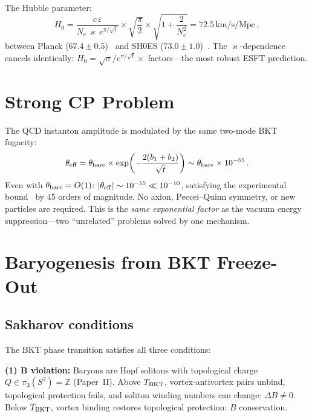 \documentclass[twocolumn,preprintnumbers,amsmath,amssymb,prd]{revtex4-2}
\begin{document}
The Hubble parameter:
\begin{equation}
H_0 = \frac{c\,\varepsilon}{N_c\,\varkappa\,e^{\pi/\sqrt{t}}} \times \sqrt{\frac{\pi}{2}} \times \sqrt{1+\frac{2}{N_c^2}} = 72.5\,\text{km/s/Mpc}\,,
\label{eq:H0}
\end{equation}
between Planck ($67.4 \pm 0.5$)~\cite{Planck2020} and SH0ES ($73.0 \pm 1.0$)~\cite{Riess2022}.
The $\varkappa$-dependence cancels identically: $H_0 = \sqrt{\sigma}/e^{\pi/\sqrt{t}} \times$ factors---the most robust ESFT prediction.

\section{Strong CP Problem}
\label{sec:strongCP}

The QCD instanton amplitude is modulated by the same two-mode BKT fugacity:
\begin{equation}
\theta_{\rm eff} = \theta_{\rm bare} \times \exp\!\left(-\frac{2(b_1+b_2)}{\sqrt{t}}\right) \sim \theta_{\rm bare}\times 10^{-55}\,.
\end{equation}
Even with $\theta_{\rm bare} = O(1)$: $|\theta_{\rm eff}| \sim 10^{-55} \ll 10^{-10}$, satisfying the experimental bound~\cite{Baker2006} by 45 orders of magnitude.
No axion, Peccei--Quinn symmetry, or new particles are required.
This is the \emph{same exponential factor} as the vacuum energy suppression---two ``unrelated'' problems solved by one mechanism.

\section{Baryogenesis from BKT Freeze-Out}
\label{sec:baryogenesis}

\subsection{Sakharov conditions}

The BKT phase transition satisfies all three conditions:

\textbf{(1) B violation:}
Baryons are Hopf solitons with topological charge $Q \in \pi_3(S^2) = \mathbb{Z}$ (Paper~II).
Above $T_{\rm BKT}$, vortex-antivortex pairs unbind, topological protection fails, and soliton winding numbers can change: $\Delta B \neq 0$.
Below $T_{\rm BKT}$, vortex binding restores topological protection: $B$ conservation.
\end{document}
